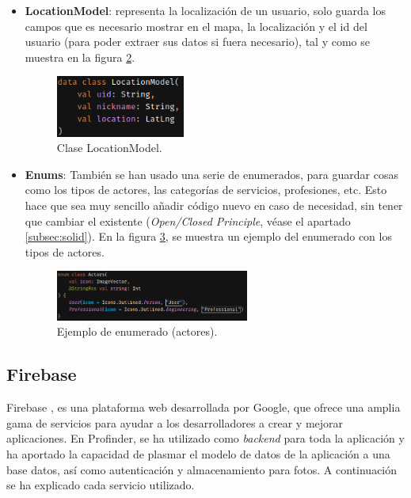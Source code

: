 \begin{itemize}
\begin{figure}[h]
        \label{fig:ChatMsgModel}
    \end{figure}
    \item \textbf{LocationModel}: representa la localización de un usuario, solo guarda los campos que es necesario mostrar en el mapa, la localización y el id del usuario (para poder extraer sus datos si fuera necesario), tal y como se muestra en la figura \ref{fig:LocationModel}.
    \begin{figure}[h]
        \centering
        \includegraphics[width = 0.4\textwidth]{Imagenes/Fuentes/LocationModel.png}
        \caption{Clase LocationModel.}
        \label{fig:LocationModel}
    \end{figure}
    \item \textbf{Enums}: También se han usado una serie de enumerados, para guardar cosas como los tipos de actores, las categorías de servicios, profesiones, etc. Esto hace que sea muy sencillo añadir código nuevo en caso de necesidad, sin tener que cambiar el existente (\textit{Open/Closed Principle}, véase el apartado \ref{subsec:solid}). En la figura \ref{fig:ejemplo_enum}, se muestra un ejemplo del enumerado con los tipos de actores.
    
    \begin{figure}[h]
        \centering
        \includegraphics[width = 0.6\textwidth]{Imagenes/Fuentes/ejemplo_enum.png}
        \caption{Ejemplo de enumerado (actores).}
        \label{fig:ejemplo_enum}
    \end{figure}
\end{itemize}

\hypertarget{subsec:firebase}{}
\subsection{Firebase} 
\label{subsec:firebase}
Firebase \hyperlink{cap:biblio}{}, es una plataforma web desarrollada por Google, que ofrece una amplia gama de servicios para ayudar a los desarrolladores a crear y mejorar aplicaciones. En Profinder, se ha utilizado como \textit{backend} para toda la aplicación y ha aportado la capacidad de plasmar el modelo de datos de la aplicación a una base datos, así como autenticación y almacenamiento para fotos. A continuación se ha explicado cada servicio utilizado.
